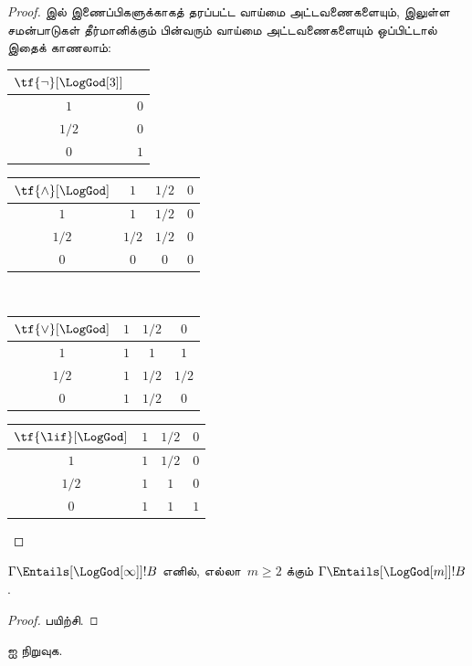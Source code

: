 \documentclass[../../../include/open-logic-section]{subfiles}
\begin{document}
\begin{proof}
   இல் இணைப்பிகளுக்காகத் தரப்பட்ட வாய்மை
  அட்டவணைகளையும்,  இலுள்ள சமன்பாடுகள் தீர்மானிக்கும்
  பின்வரும் வாய்மை அட்டவணைகளையும் ஒப்பிட்டால் இதைக் காணலாம்:
  \begin{center}
    \begin{tabular}{c|c} 
      $\tf{\lnot}[\LogGod[3]]$ & \\ 
      \hline  
      $1$ & $0$ \\ 
      $1/2$ & $0$ \\
      $0$ & $1$ 
    \end{tabular}
    \quad
    \begin{tabular}{c|ccc} 
      $\tf{\land}[\LogGod]$ & $1$ & $1/2$ & $0$ \\ 
      \hline 
      $1$ & $1$ & $1/2$ & $0$ \\ 
      $1/2$ & $1/2$ & $1/2$ & $0$\\ 
      $0$ & $0$ & $0$ & $0$ 
    \end{tabular}
    \\[2ex]
    \begin{tabular}{c|ccc} 
      $\tf{\lor}[\LogGod]$ & $1$ & $1/2$ & $0$ \\ 
      \hline 
      $1$ & $1$ & $1$ & $1$ \\ 
      $1/2$ & $1$ & $1/2$ & $1/2$ \\
      $0$ & $1$ & $1/2$ & $0$ 
    \end{tabular}
    \quad
    \begin{tabular}{c|ccc} 
      $\tf{\lif}[\LogGod]$ & $1$ & $1/2$ & $0$ \\ 
      \hline 
      $1$ & $1$ & $1/2$ & $0$ \\ 
      $1/2$ & $1$ & $1$ & $0$  \\ 
      $0$ & $1$ & $1$ & $1$ 
    \end{tabular}
  \end{center} 
\end{proof}

\begin{prop}
  $\Gamma \Entails[\LogGod[\infty]] !B$ எனில், எல்லா~$m \ge 2$ க்கும்
  $\Gamma \Entails[\LogGod[m]] !B$.
\end{prop}

\begin{proof}
  பயிற்சி.
\end{proof}

\begin{prob}
   ஐ நிறுவுக.
\end{prob}
\end{document}
